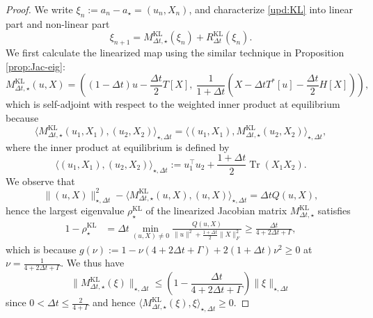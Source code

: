 \documentclass[11pt]{article}
\theoremstyle{plain}
\theoremstyle{definition}
\theoremstyle{remark}
\newcommand{\KL}{\mathrm{KL}}
\newcommand{\Tr}{\operatorname{Tr}}
\begin{document}
\begin{proof}
    We write $\xi_n:= a_n - a_\star = (u_n, X_n)$, and characterize \eqref{upd:KL} into linear part and non-linear part
    \begin{equation*}
        \xi_{n+1} = M_{\Delta t, \star}^\KL (\xi_n) + R_{\Delta t}^\KL (\xi_n).
    \end{equation*}
    We first calculate the linearized map using the similar technique in Proposition \ref{prop:Jac-eig}:
    \begin{equation*}
        M_{\Delta t, \star}^\KL (u, X) = \left( (1 - \Delta t) u - \frac{\Delta t}{2} T[X],\ \frac{1}{1 + \Delta t} \left( X - \Delta t T^*[u] - \frac{\Delta t}{2} H[X] \right) \right),
    \end{equation*}
    which is self-adjoint with respect to the weighted inner product at equilibrium because $$\langle M_{\Delta t, \star}^\KL (u_1, X_1), (u_2, X_2) \rangle_{\star, \Delta t} = \langle (u_1, X_1), M_{\Delta t, \star}^\KL (u_2, X_2) \rangle_{\star, \Delta t},$$ where the inner product at equilibrium is defined by
    \begin{equation*}
        \langle (u_1, X_1), (u_2, X_2) \rangle_{\star, \Delta t} := u_1^\top u_2 + \frac{1 + \Delta t}{2} \Tr (X_1 X_2).
    \end{equation*}
    We observe that
    \begin{equation*}
        \|(u, X)\|_{\star, \Delta t}^2 - \langle M_{\Delta t, \star}^\KL (u, X), (u, X) \rangle_{\star, \Delta t} = \Delta t Q(u, X),
    \end{equation*}
    hence the largest eigenvalue $\rho_\star^\KL$ of the linearized Jacobian matrix $M_{\Delta t, \star}^\KL$ satisfies
    \begin{align*}
        1 - \rho_\star^\KL &= \Delta t \min_{(u, X) \neq 0} \frac{Q(u, X)}{\|u\|^2 + \frac{1 + \Delta t}{2} \|X\|_F^2} \geq \frac{\Delta t}{4 + 2\Delta t + \Gamma},
    \end{align*}
    which is because $g(\nu) := 1 - \nu (4 + 2 \Delta t + \Gamma) + 2 (1 + \Delta t) \nu^2 \geq 0$ at $\nu = \frac{1}{4 + 2 \Delta t + \Gamma}$.
    We thus have
    \begin{equation*}
        \|M_{\Delta t, \star}^\KL (\xi)\|_{\star, \Delta t} \leq \left( 1 - \frac{\Delta t}{4 + 2\Delta t + \Gamma} \right) \|\xi\|_{\star, \Delta t}
    \end{equation*}
    since $0 < \Delta t \leq \frac{2}{4 + \Gamma}$ and hence $\langle M_{\Delta t, \star}^\KL (\xi), \xi \rangle_{\star, \Delta t}\geq 0$.


\end{proof}
\end{document}
